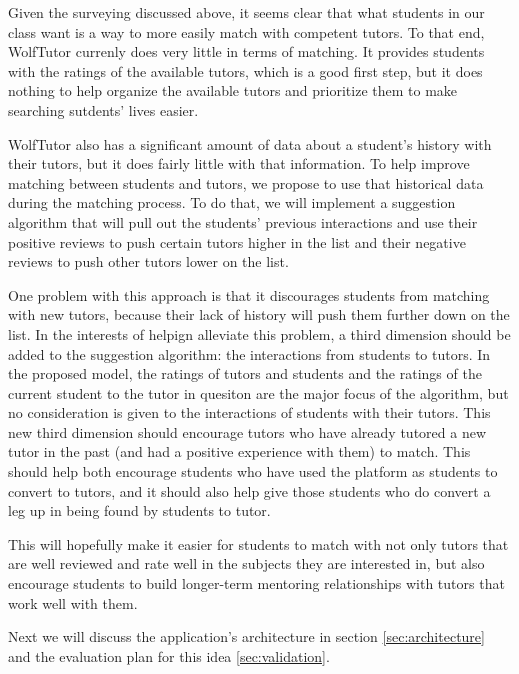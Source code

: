 
Given the surveying discussed above, it seems clear that what students
in our class want is a way to more easily match with competent
tutors.  To that end, WolfTutor currenly does very little in terms of
matching.  It provides students with the ratings of the available
tutors, which is a good first step, but it does nothing to help
organize the available tutors and prioritize them to make searching
sutdents' lives easier.  

WolfTutor also has a significant amount of data about a student's
history with their tutors, but it does fairly little with that
information.  To help improve matching between students and tutors, we
propose to use that historical data during the matching process. To do
that, we will implement a suggestion algorithm that will pull out the
students' previous interactions and use their positive reviews to push
certain tutors higher in the list and their negative reviews to push
other tutors lower on the list.

One problem with this approach is that it discourages students from
matching with new tutors, because their lack of history will push them
further down on the list.  In the interests of helpign alleviate this
problem, a third dimension should be added to the suggestion
algorithm: the interactions from students to tutors.  In the proposed
model, the ratings of tutors and students and the ratings of the
current student to the tutor in quesiton are the major focus of the
algorithm, but no consideration is given to the interactions of
students with their tutors.  This new third dimension should encourage
tutors who have already tutored a new tutor in the past (and had a
positive experience with them) to match.  This should help both
encourage students who have used the platform as students to convert
to tutors, and it should also help give those students who do convert
a leg up in being found by students to tutor.

This will hopefully make it easier for students to match with not only
tutors that are well reviewed and rate well in the subjects they are
interested in, but also encourage students to build longer-term
mentoring relationships with tutors that work well with them.  

Next we will discuss the application's architecture in section
\ref{sec:architecture} and the evaluation plan for this idea \ref{sec:validation}.
